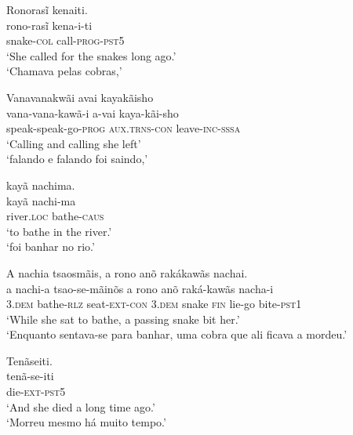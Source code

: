 \documentclass[output=paper,
modfonts,nonflat
]{langsci/langscibook}
\begin{document}
\ea Ronorasĩ kenaiti. \\[.3em]
\gll rono-rasĩ          kena-i-ti               \\
     snake-\textsc{col} call-\textsc{prog-pst5} \\
\glt `She called for the snakes long ago.' \\
`Chamava pelas cobras,' \\
\z

  
\ea Vanavanakwãi avai kayakãisho \\[.3em]
\gll vana-vana-kawã-i             a-vai                 kaya-kãi-sho            \\
     speak-speak-go-\textsc{prog} \textsc{aux.trns-con} leave-\textsc{inc-sssa} \\
\glt `Calling and calling she left' \\
`falando e falando foi saindo,'\\
\z

\newpage 
\ea kayã nachima. \\[.3em]
\gll kayã               nachi-ma            \\
     river.\textsc{loc} bathe-\textsc{caus} \\
\glt `to bathe in the river.' \\
`foi banhar no rio.'\\
\z

\ea A nachia tsaosmãis, a rono anõ rakákawãs nachai. \\[.3em]
\gll a              nachi-a            tsao-se-mãinõs       a              rono  anõ          raká-kawãs nacha-i            \\
     3.\textsc{dem} bathe-\textsc{rlz} seat-\textsc{ext-con} 3.\textsc{dem} snake \textsc{fin} lie-go     bite-\textsc{pst1} \\
\glt `While she sat to bathe, a passing snake bit her.' \\
`Enquanto sentava-se para banhar, uma cobra que ali ficava a mordeu.' \\
\z

\ea Tenãseiti. \\[.3em]
\gll tenã-se-iti           \\
     die-\textsc{ext-pst5} \\
\glt `And she died a long time ago.'\footnotemark \\
`Morreu mesmo há muito tempo.' \\
\z

\end{document}
